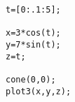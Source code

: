 \begin{verbatim}
t=[0:.1:5];

x=3*cos(t);
y=7*sin(t);
z=t;

cone(0,0);
plot3(x,y,z);
\end{verbatim}
